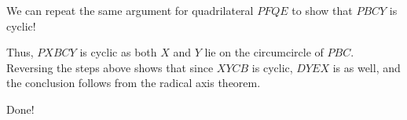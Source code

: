 


We can repeat the same argument for quadrilateral $PFQE$ to show that $PBCY$ is cyclic!

Thus, $PXBCY$ is cyclic as both $X$ and $Y$ lie on the circumcircle of $PBC$. Reversing the steps above shows that since $XYCB$ is cyclic, $DYEX$ is as well, and the conclusion follows from the radical axis theorem.

Done! 























